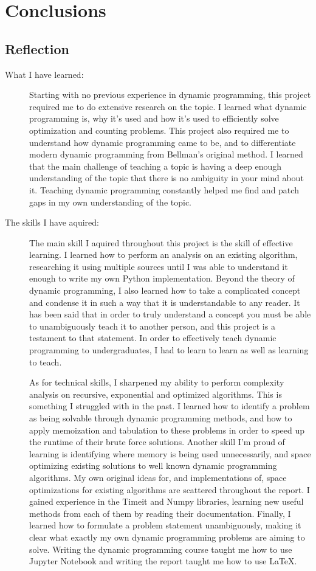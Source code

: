 \chapter{Conclusions}
\section{Reflection}
\begin{description}
    \item[What I have learned:]
    Starting with no previous experience in dynamic programming,
    this project required me to do extensive research on the topic.
    I learned what dynamic programming is, why it's used and how it's used to efficiently solve optimization and counting problems.
    This project also required me to understand how dynamic programming came to be, and to differentiate modern dynamic programming from Bellman's original method.
    I learned that the main challenge of teaching a topic is having a deep enough understanding of the topic that there is no ambiguity in your mind about it.
    Teaching dynamic programming constantly helped me find and patch gaps in my own understanding of the topic.
    
    \item[The skills I have aquired:]
    The main skill I aquired throughout this project is the skill of effective learning.
    I learned how to perform an analysis on an existing algorithm, researching it using multiple sources until I was able to understand it enough to write my own Python implementation.
    Beyond the theory of dynamic programming, I also learned how to take a complicated concept and condense it in such a way that it is understandable to any reader.
    It has been said that in order to truly understand a concept you must be able to unambiguously teach it to another person, and this project is a testament to that statement.
    In order to effectively teach dynamic programming to undergraduates, I had to learn to learn as well as learning to teach.

    As for technical skills, I sharpened my ability to perform complexity analysis on recursive, exponential and optimized algorithms. This is something I struggled with in the past.
    I learned how to identify a problem as being solvable through dynamic programming methods, and how to apply memoization and tabulation to these problems in order to speed up the runtime of their brute force solutions.
    Another skill I'm proud of learning is identifying where memory is being used unnecessarily, and space optimizing existing solutions to well known dynamic programming algorithms. My own original ideas for, and implementations of, space optimizations for existing algorithms are scattered throughout the report.
    I gained experience in the Timeit and Numpy libraries, learning new useful methods from each of them by reading their documentation.
    Finally, I learned how to formulate a problem statement unambiguously, making it clear what exactly my own dynamic programming problems are aiming to solve.
    Writing the dynamic programming course taught me how to use Jupyter Notebook and writing the report taught me how to use LaTeX.
\end{description}
